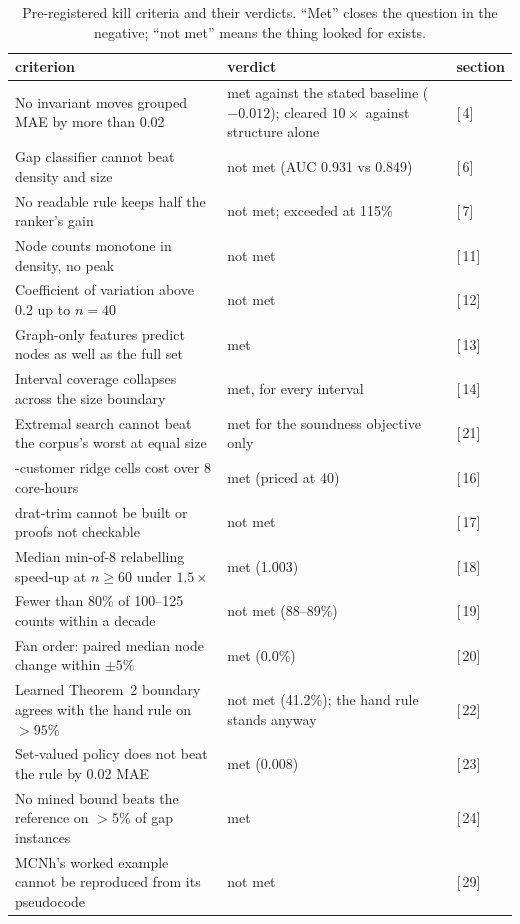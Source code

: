 \documentclass[11pt,a4paper]{article}
\renewcommand{\S}[1]{[\textsection\,#1]}
\begin{document}
\begin{table}[p]
\centering
\small
\caption{Pre-registered kill criteria and their verdicts. ``Met'' closes the
question in the negative; ``not met'' means the thing looked for exists.}
\label{tab:kill}
\begin{tabular}{>{\raggedright\arraybackslash}p{}>{\raggedright\arraybackslash}p{}l}
\toprule
criterion & verdict & section \\
\midrule
No invariant moves grouped MAE by more than 0.02 & met against the stated baseline ($-0.012$); cleared $10\times$ against structure alone & \S{4} \\
Gap classifier cannot beat density and size & not met (AUC 0.931 vs 0.849) & \S{6} \\
No readable rule keeps half the ranker's gain & not met; exceeded at 115\% & \S{7} \\
Node counts monotone in density, no peak & not met & \S{11} \\
Coefficient of variation above 0.2 up to $n=40$ & not met & \S{12} \\
Graph-only features predict nodes as well as the full set & met & \S{13} \\
Interval coverage collapses across the size boundary & met, for every interval & \S{14} \\
Extremal search cannot beat the corpus's worst at equal size & met for the soundness objective only & \S{21} \\
100-customer ridge cells cost over 8 core-hours & met (priced at 40) & \S{16} \\
drat-trim cannot be built or proofs not checkable & not met & \S{17} \\
Median min-of-8 relabelling speed-up at $n \ge 60$ under $1.5\times$ & met (1.003) & \S{18} \\
Fewer than 80\% of 100--125 counts within a decade & not met (88--89\%) & \S{19} \\
Fan order: paired median node change within $\pm 5\%$ & met (0.0\%) & \S{20} \\
Learned Theorem~2 boundary agrees with the hand rule on $> 95\%$ & not met (41.2\%); the hand rule stands anyway & \S{22} \\
Set-valued policy does not beat the rule by 0.02 MAE & met (0.008) & \S{23} \\
No mined bound beats the reference on $> 5\%$ of gap instances & met & \S{24} \\
MCNh's worked example cannot be reproduced from its pseudocode & not met & \S{29} \\

\end{tabular}
\end{table}
\end{document}
